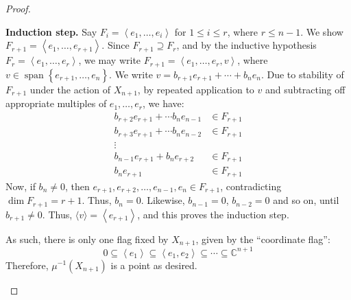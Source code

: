 \documentclass[11pt]{article}
\newcommand{\C}{\mathbb{C}}
\newcommand{\Sp}{\operatorname{span}}
\theoremstyle{definition}
\numberwithin{equation}{section} %
\begin{document}
\begin{proof}
\begin{enumerate}[(a)]
        \textbf{Induction step.} Say $F_i = \left\langle e_1, \ldots, e_i\right\rangle$ for $1\leq i\leq r$, where $r\leq n-1$. We show $F_{r+1} = \left\langle e_1, \ldots, e_{r+1}\right\rangle$. Since $F_{r+1}\supseteq F_r$, and by the inductive hypothesis $F_r = \left\langle e_1, \ldots, e_{r}\right\rangle$, we may write $F_{r+1} = \left\langle e_1, \ldots, e_{r},v\right\rangle$, where $v\in \Sp\left\{e_{r+1},\ldots, e_n\right\}$. We write $v=b_{r+1}e_{r+1} + \cdots + b_ne_n$. Due to stability of $F_{r+1}$ under the action of $X_{n+1}$, by repeated application to $v$ and subtracting off appropriate multiples of $e_1,\ldots, e_r$, we have:
        \begin{align*}
        b_{r+2} e_{r+1} + \cdots  b_ne_{n-1} &\in F_{r+1} \\
        b_{r+3} e_{r+1} + \cdots  b_ne_{n-2} &\in F_{r+1} \\
        \vdots \\
        b_{n-1} e_{r+1} + b_ne_{r+2} &\in F_{r+1} \\
        b_n e_{r+1} &\in F_{r+1}
        \end{align*}
        Now, if $b_n\neq 0$, then $e_{r+1}, e_{r+2}, \ldots, e_{n-1}, e_n\in F_{r+1}$, contradicting $\dim F_{r+1} = r+1$. Thus, $b_n =0$. Likewise, $b_{n-1} =0$, $b_{n-2} =0$ and so on, until $b_{r+1} \neq 0$. Thus, $\langle v\rangle = \left\langle e_{r+1}\right\rangle$, and this proves the induction step. 

        \smallskip

        As such, there is only one flag fixed by $X_{n+1}$, given by the ``coordinate flag'':
        $$
        0 \subseteq \left\langle e_1\right\rangle \subseteq \left\langle e_1,e_2\right\rangle \subseteq \cdots \subseteq \C^{n+1}
        $$
        Therefore, $\mu^{-1}\left(X_{n+1}\right)$ is a point as desired.


\end{enumerate}
\end{proof}
\end{document}
